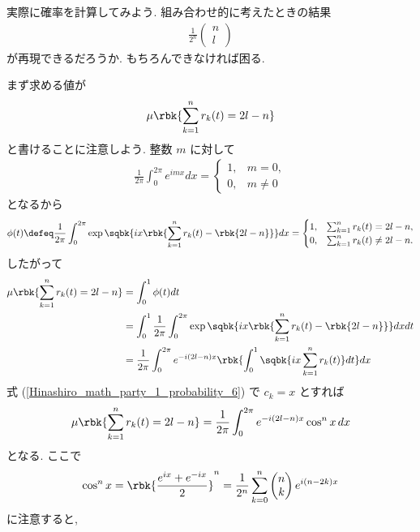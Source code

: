 \documentclass[openany, a4paper, oneside]{jsbook}
\begin{document}
実際に確率を計算してみよう.
組み合わせ的に考えたときの結果
\begin{align}
 \frac{1}{2^n}
 \begin{pmatrix}
  n \\
  l
 \end{pmatrix}
\end{align}
が再現できるだろうか.
もちろんできなければ困る.

まず求める値が
\begin{align}
 \mu \rbk{\sum_{k=1}^{n} r_k (t) = 2l - n}
\end{align}
と書けることに注意しよう.
整数 $m$ に対して
\begin{align}
 \frac{1}{2 \pi} \int_0^{2 \pi} e^{imx} dx
 =
 \begin{cases}
  1, & m=0, \\
  0, & m \neq 0
 \end{cases}
\end{align}
となるから
\begin{align}
 \phi (t)
 \defeq
 \frac{1}{2 \pi} \int_0^{2 \pi} \exp \sqbk{ix \rbk{\sum_{k=1}^{n} r_k (t) - \rbk{2l-n}}} dx
 =
 \begin{cases}
  1, &  \sum_{k=1}^{n} r_k (t) = 2l - n, \\
  0, &  \sum_{k=1}^{n} r_k (t) \neq 2l - n.
 \end{cases}
\end{align}
したがって
\begin{align}
 \mu \rbk{\sum_{k=1}^n r_k (t) = 2 l - n}
 &=
 \int_0^1 \phi (t) dt \\
 &=
 \int_0^1 \frac{1}{2 \pi} \int_0^{2 \pi} \exp \sqbk{ix \rbk{\sum_{k=1}^{n} r_k (t) - \rbk{2l-n}}} dx dt \\
 &=
 \frac{1}{2 \pi} \int_0^{2 \pi} e^{-i (2l -n) x} \rbk{\int_0^1 \sqbk{ix \sum_{k=1}^{n} r_k (t)} dt} dx
\end{align}
式 (\ref{Hinashiro_math_party_1_probability_6}) で $c_k = x$ とすれば
\begin{align}
 \mu \rbk{\sum_{k=1}^n r_k (t) = 2 l - n}
 =
 \frac{1}{2 \pi} \int_0^{2 \pi} e^{-i (2l -n) x} \cos^n x \, dx
\end{align}
となる.
ここで
\begin{align}
 \cos^n x
 =
 \rbk{\frac{e^{ix} + e^{-ix}}{2}}^n
 =
 \frac{1}{2^n} \sum_{k=0}^n
 \begin{pmatrix}
  n \\
  k
 \end{pmatrix}
 e^{i (n - 2k) x}
\end{align}
に注意すると,
\end{document}
